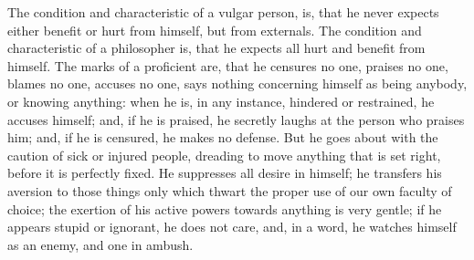The condition and characteristic of a  vulgar person, is, that he never expects
either benefit  or hurt  from himself,  but from  externals. The  condition and
characteristic of a  philosopher is, that he expects all  hurt and benefit from
himself. The  marks of a  proficient are, that he  censures no one,  praises no
one, blames  no one, accuses no  one, says nothing concerning  himself as being
anybody,  or  knowing anything:  when  he  is,  in  any instance,  hindered  or
restrained, he  accuses himself; and, if  he is praised, he  secretly laughs at
the person who praises him; and, if he is censured, he makes no defense. But he
goes  about with  the  caution of  sick  or injured  people,  dreading to  move
anything that  is set right,  before it is  perfectly fixed. He  suppresses all
desire in himself; he transfers his  aversion to those things only which thwart
the proper use of our own faculty  of choice; the exertion of his active powers
towards anything is very gentle; if he  appears stupid or ignorant, he does not
care, and, in a word, he watches himself as an enemy, and one in ambush.
